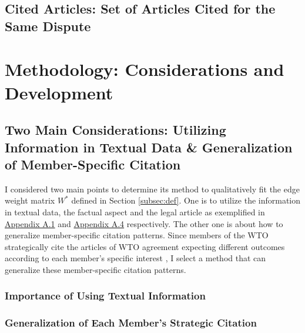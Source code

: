 \documentclass[12pt,letterpaper]{article}
\begin{document}
\subsection{Cited Articles: Set of Articles Cited for the Same Dispute}

\section{Methodology: Considerations and Development} \label{sec:methods}


\subsection{Two Main Considerations: Utilizing Information in Textual Data \& Generalization of Member-Specific Citation} \label{justification-nn}
I considered two main points to
determine its method to qualitatively fit the edge weight matrix $W^*$ defined in Section \ref{subsec:def}.
One is to utilize the information in textual data, the factual aspect and the legal article as exemplified in \hyperref[sub:factual-aspect-example]{Appendix A.1} and \hyperref[fig:gatt_art1]{Appendix A.4} respectively. The other one is about how to generalize member-specific citation patterns. Since members of the WTO strategically cite
the articles of WTO agreement expecting different outcomes according to each member's specific interest \citep{who_gets, pelc, latent}, I
select a method that can generalize these member-specific citation patterns.%
 

\subsubsection{Importance of Using Textual Information}


\subsubsection{Generalization of Each Member's Strategic Citation}
\end{document}
